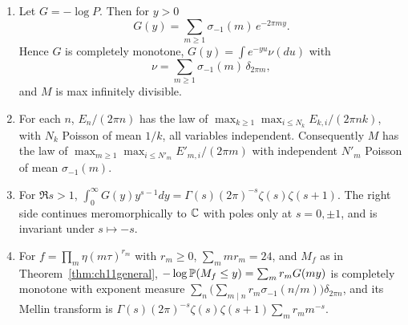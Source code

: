 \begin{proposition}\label{prop:10cmaxid}
\begin{enumerate}
\item Let $G=-\log P$. Then for $y>0$
\[
G(y)=\sum_{m\ge1}\sigma_{-1}(m)\,e^{-2\pi my}.
\]
Hence $G$ is completely monotone, $G(y)=\int e^{-yu}\nu(du)$ with
\[
\nu=\sum_{m\ge1}\sigma_{-1}(m)\,\delta_{2\pi m},
\]
and $M$ is max infinitely divisible.
\item For each $n$, $E_n/(2\pi n)$ has the law of $\max_{k\ge1}\max_{i\le N_k}E_{k,i}/(2\pi nk)$, with $N_k$ Poisson of mean $1/k$, all variables independent. Consequently $M$ has the law of $\max_{m\ge1}\max_{i\le N'_m}E'_{m,i}/(2\pi m)$ with independent $N'_m$ Poisson of mean $\sigma_{-1}(m)$.
\item For $\Re s>1$, $\int_0^\infty G(y)y^{s-1}dy=\Gamma(s)(2\pi)^{-s}\zeta(s)\zeta(s+1)$. The right side continues meromorphically to $\mathbb{C}$ with poles only at $s=0,\pm1$, and is invariant under $s\mapsto-s$.
\item For $f=\prod_m\eta(m\tau)^{r_m}$ with $r_m\ge0$, $\sum_mmr_m=24$, and $M_f$ as in Theorem~\ref{thm:ch11general}, $-\log\mathbb{P}(M_f\le y)=\sum_mr_mG(my)$ is completely monotone with exponent measure $\sum_n\big(\sum_{m\mid n}r_m\sigma_{-1}(n/m)\big)\delta_{2\pi n}$, and its Mellin transform is $\Gamma(s)(2\pi)^{-s}\zeta(s)\zeta(s+1)\sum_mr_mm^{-s}$.
\end{enumerate}
\end{proposition}


